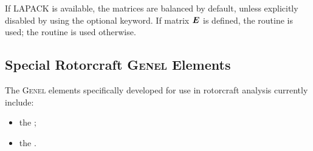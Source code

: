 If LAPACK is available, the matrices are balanced by default,
unless explicitly disabled by using the  optional keyword.
If matrix $\boldsymbol{E}$ is defined, the  routine is used;
the  routine is used otherwise.


\subsection{Special Rotorcraft \textsc{Genel} Elements}
The \textsc{Genel} elements specifically developed for use
in rotorcraft analysis currently include:
\begin{itemize}
\item the ;
\item the .
\end{itemize}

